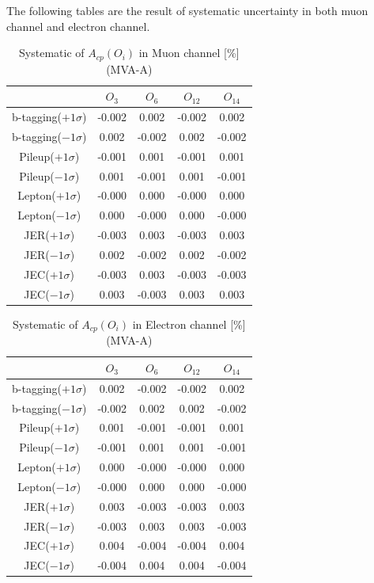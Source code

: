 		The following tables are the result of systematic uncertainty in both muon channel and electron channel.

		\begin{center}
		\setlength{\tabcolsep}{12pt}
		\begin{longtable}{ | c | c c c c | }
		\caption{Systematic of $A_{cp}(O_i)$ in Muon channel [\%] (MVA-A)}\\
		\hline
		 [\%] & $O_3$ & $O_6$ & $O_{12}$ & $O_{14}$ \\
		\hline
		b-tagging($+1\sigma$) & -0.002 & 0.002 & -0.002 & 0.002 \\
		b-tagging($-1\sigma$) & 0.002 & -0.002 & 0.002 & -0.002 \\
		\hline
		Pileup($+1\sigma$) & -0.001 & 0.001 & -0.001 & 0.001 \\
		Pileup($-1\sigma$) & 0.001 & -0.001 & 0.001 & -0.001 \\
		\hline
		Lepton($+1\sigma$) & -0.000 & 0.000 & -0.000 & 0.000 \\
		Lepton($-1\sigma$) & 0.000 & -0.000 & 0.000 & -0.000 \\
		\hline
		JER($+1\sigma$) & -0.003 & 0.003 & -0.003 & 0.003 \\
		JER($-1\sigma$) & 0.002 & -0.002 & 0.002 & -0.002 \\
		\hline
		JEC($+1\sigma$) & -0.003 & 0.003 & -0.003 & -0.003 \\
		JEC($-1\sigma$) & 0.003 & -0.003 & 0.003 & 0.003 \\
		\hline
		\end{longtable}
		\end{center}

		\begin{center}
		\setlength{\tabcolsep}{12pt}
		\begin{longtable}{ | c | c c c c | }
		\caption{Systematic of $A_{cp}(O_i)$ in Electron channel [\%] (MVA-A)}\\
		\hline
		 [\%] & $O_3$ & $O_6$ & $O_{12}$ & $O_{14}$ \\
		\hline
		b-tagging($+1\sigma$) & 0.002 & -0.002 & -0.002 & 0.002 \\
		b-tagging($-1\sigma$) & -0.002 & 0.002 & 0.002 & -0.002 \\
		\hline
		Pileup($+1\sigma$) & 0.001 & -0.001 & -0.001 & 0.001 \\
		Pileup($-1\sigma$) & -0.001 & 0.001 & 0.001 & -0.001 \\
		\hline
		Lepton($+1\sigma$) & 0.000 & -0.000 & -0.000 & 0.000 \\
		Lepton($-1\sigma$) & -0.000 & 0.000 & 0.000 & -0.000 \\
		\hline
		JER($+1\sigma$) & 0.003 & -0.003 & -0.003 & 0.003 \\
		JER($-1\sigma$) & -0.003 & 0.003 & 0.003 & -0.003 \\
		\hline
		JEC($+1\sigma$) & 0.004 & -0.004 & -0.004 & 0.004 \\
		JEC($-1\sigma$) & -0.004 & 0.004 & 0.004 & -0.004 \\
		\hline
		\end{longtable}
		\end{center}


